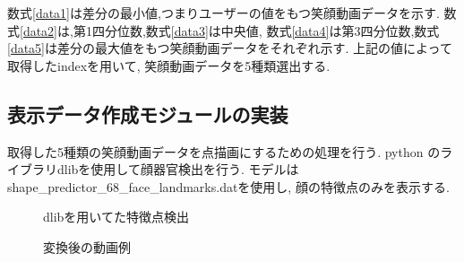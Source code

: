 数式\ref{data1}は差分の最小値,つまりユーザーの値をもつ笑顔動画データを示す.
数式\ref{data2}は,第1四分位数,数式\ref{data3}は中央値,
数式\ref{data4}は第3四分位数,数式\ref{data5}は差分の最大値をもつ笑顔動画データをそれぞれ示す.
上記の値によって取得したindexを用いて, 笑顔動画データを5種類選出する.

\subsection{表示データ作成モジュールの実装}
取得した5種類の笑顔動画データを点描画にするための処理を行う.
python のライブラリdlibを使用して顔器官検出を行う.
モデルはshape\_predictor\_68\_face\_landmarks.datを使用し, 顔の特徴点のみを表示する.

\begin{figure}[htbp]
    \begin{center}
    \end{center}
    \caption{dlibを用いてた特徴点検出}
    \label{fig:dlibfacepoits}
\end{figure}

\begin{figure}[htbp]
    \begin{center}
    \end{center}
    \caption{変換後の動画例}
    \label{fig:face_convert}
\end{figure}

